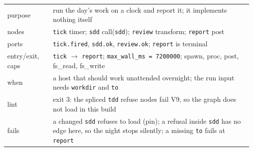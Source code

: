 \begin{center}
\begin{minipage}{\linewidth}
\centering
{}
\end{minipage}
\end{center}

\begin{center}\footnotesize
\begin{tabular}{@{}>{\raggedright\arraybackslash}p{}>{\raggedright\arraybackslash}p{}@{}}
  purpose & run the day's work on a clock and report it; it implements nothing itself \\
  nodes & \texttt{tick} timer; \texttt{sdd} call(\texttt{sdd}); \texttt{review} transform;
    \texttt{report} post \\
  ports & \texttt{tick.fired}, \texttt{sdd.ok}, \texttt{review.ok}; \texttt{report} is terminal \\
  entry/exit, caps & \texttt{tick} $\to$ \texttt{report}; \texttt{max\_wall\_ms = 7200000}; spawn, proc, post, fs\_read, fs\_write \\
  when & a host that should work unattended overnight; the run input needs
    \texttt{workdir} and \texttt{to} \\
  lint & exit 3: the spliced \texttt{tdd} refuse nodes fail V9, so the graph does not load
    in this build \\
  fails & a changed \texttt{sdd} refuses to load (pin); a refusal inside \texttt{sdd} has no
    edge here, so the night stops silently; a missing \texttt{to} fails at \texttt{report} \\
\end{tabular}
\end{center}

